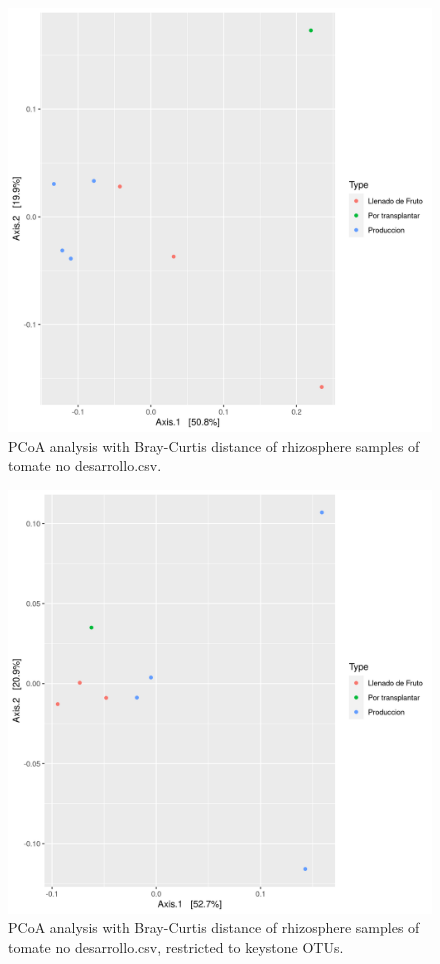 \documentclass{article}
\begin{document}
\begin{figure}
   \centering
   \includegraphics[scale = 0.7]{pcoa_muestras_tomate_no_desarrollo.csv.png}
 \caption{PCoA analysis with Bray-Curtis distance of rhizosphere samples of tomate no desarrollo.csv.}
 \label{fig:tomate_no_desarrollo.csv_pcoa}
\end{figure}
\begin{figure}
  \centering
  \includegraphics[scale = 0.7]{pcoa_key_otus_tomate_no_desarrollo.csv.png}
  \caption{PCoA analysis with Bray-Curtis distance of rhizosphere samples of tomate no desarrollo.csv, restricted to keystone OTUs.}
  \label{fig:tomate_no_desarrollo.csv_pcoa_key_otus}
\end{figure}
\end{document}
